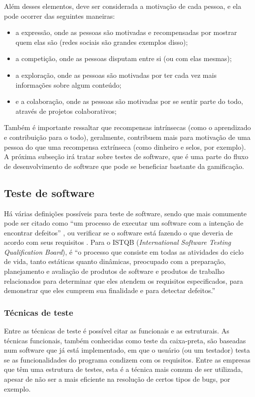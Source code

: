 \documentclass[twoside,english,brazilian]{UNISINOSartigo}
\begin{document}
Além desses elementos, deve ser considerada a motivação de cada pessoa, e ela pode ocorrer das seguintes maneiras:

\begin{itemize}
	\item a expressão, onde as pessoas são motivadas e recompensadas por mostrar quem elas são (redes sociais são grandes exemplos disso);
	\item a competição, onde as pessoas disputam entre si (ou com elas mesmas);
	\item a exploração, onde as pessoas são motivadas por ter cada vez mais informações sobre algum conteúdo;
	\item e a colaboração, onde as pessoas são motivadas por se sentir parte do todo, através de projetos colaborativos;
\end{itemize}

Também é importante ressaltar que recompensas intrínsecas (como o aprendizado e contribuição para o todo), geralmente, contribuem mais para motivação de uma pessoa do que uma recompensa extrínseca (como dinheiro e selos, por exemplo). A próxima subseção irá tratar sobre testes de software, que é uma parte do fluxo de desenvolvimento de software que pode se beneficiar bastante da gamificação.


\subsection{Teste de software}

Há várias definições possíveis para teste de software, sendo que mais comumente pode ser citado como ``um processo de executar um software com a intenção de encontrar defeitos'' \cite{Myers-1979}, ou verificar se o software está fazendo o que deveria de acordo com seus requisitos \cite{RiosMoreira-2002}. Para o ISTQB (\textit{International Software Testing Qualification Board}), é ``o processo que consiste em todas as atividades do ciclo de vida, tanto estáticas quanto dinâmicas, preocupado com a preparação, planejamento e avaliação de produtos de software e produtos de trabalho relacionados para determinar que eles atendem os requisitos especificados, para demonstrar que eles cumprem sua finalidade e para detectar defeitos.'' \cite{ISTQB-Glos12}

\subsubsection{Técnicas de teste}
Entre as técnicas de teste é possível citar as funcionais e as estruturais. As técnicas funcionais, também conhecidas como teste da caixa-preta, são baseadas num software que já está implementado, em que o usuário (ou um testador) testa se as funcionalidades do programa condizem com os requisitos. Entre as empresas que têm uma estrutura de testes, esta é a técnica mais comum de ser utilizada, apesar de não ser a mais eficiente na resolução de certos tipos de bugs, por exemplo. 
\end{document}
